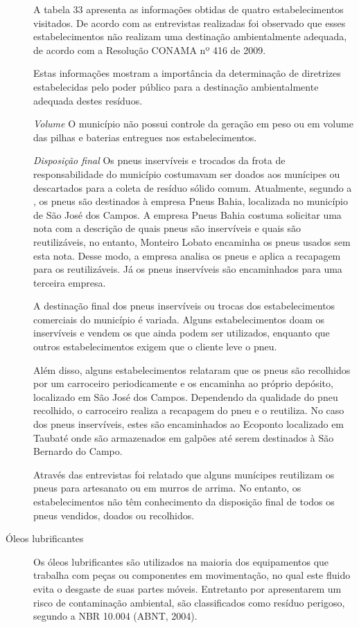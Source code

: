 \begin{description}
		A tabela 33 apresenta as informações obtidas de quatro estabelecimentos visitados. De acordo com as entrevistas realizadas foi observado que esses estabelecimentos não realizam uma destinação ambientalmente adequada, de acordo com a Resolução CONAMA nº 416 de 2009.
	
		
	
		Estas informações mostram a importância da determinação de diretrizes estabelecidas pelo poder público para a destinação ambientalmente adequada destes resíduos.
	
	\subitem \textit{Volume}
	O município não possui controle da geração em peso ou em volume das pilhas e baterias entregues nos estabelecimentos.
	
	\subitem \textit{Disposição final}
	Os pneus inservíveis e trocados da frota de responsabilidade do município costumavam ser doados aos munícipes ou descartados para a coleta de resíduo sólido comum. Atualmente, segundo a , os pneus são destinados à empresa Pneus Bahia, localizada no município de São José dos Campos. A empresa Pneus Bahia costuma solicitar uma nota com a descrição de quais pneus são inservíveis e quais são reutilizáveis, no entanto, Monteiro Lobato encaminha os pneus usados sem esta nota. Desse modo, a empresa analisa os pneus e aplica a recapagem para os reutilizáveis. Já os pneus inservíveis são encaminhados para uma terceira empresa.
	
	A destinação final dos pneus inservíveis ou trocas dos estabelecimentos comerciais do município é variada. Alguns estabelecimentos doam os inservíveis e vendem os que ainda podem ser utilizados, enquanto que outros estabelecimentos exigem que o cliente leve o pneu. 
	
	Além disso, alguns estabelecimentos relataram que os pneus são 
	recolhidos por um carroceiro periodicamente e os encaminha ao próprio depósito, localizado em São José dos Campos. Dependendo da qualidade do pneu recolhido, o carroceiro realiza a recapagem do pneu e o reutiliza. No caso dos pneus inservíveis, estes são encaminhados ao Ecoponto localizado em Taubaté onde são armazenados em galpões até serem destinados à São Bernardo do Campo.
	
	Através das entrevistas foi relatado que alguns munícipes reutilizam os pneus para artesanato ou em murros de arrima. No entanto, os estabelecimentos não têm conhecimento da disposição final de todos os pneus vendidos, doados ou recolhidos.
	
	
	\item[Óleos lubrificantes]	Os óleos lubrificantes são utilizados na maioria dos equipamentos que trabalha com peças ou componentes em movimentação, no qual este fluido evita o desgaste de suas partes móveis. Entretanto por apresentarem um risco de contaminação ambiental, são classificados como resíduo perigoso, segundo a NBR 10.004 (ABNT, 2004). 
	

\end{description}

